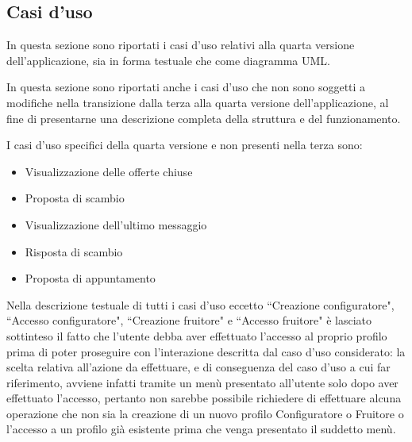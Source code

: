 \subsection{Casi d'uso}
In questa sezione sono riportati i casi d'uso relativi alla quarta versione dell'applicazione, sia in forma testuale che come diagramma UML.\bigskip 

In questa sezione sono riportati anche i casi d'uso che non sono soggetti a modifiche nella transizione dalla terza alla quarta versione dell'applicazione, al fine di presentarne una descrizione completa della struttura e del funzionamento.\bigskip

I casi d'uso specifici della quarta versione e non presenti nella terza sono:
\begin{itemize}
    \item Visualizzazione delle offerte chiuse
    \item Proposta di scambio
    \item Visualizzazione dell'ultimo messaggio
    \item Risposta di scambio
    \item Proposta di appuntamento
\end{itemize} \bigskip

Nella descrizione testuale di tutti i casi d'uso eccetto ``Creazione configuratore", ``Accesso configuratore", ``Creazione fruitore" e ``Accesso fruitore" è lasciato sottinteso il fatto che l'utente debba aver effettuato l'accesso al proprio profilo prima di poter proseguire con l'interazione descritta dal caso d'uso considerato: la scelta relativa all'azione da effettuare, e di conseguenza del caso d'uso a cui far riferimento, avviene infatti tramite un menù presentato all'utente solo dopo aver effettuato l'accesso, pertanto non sarebbe possibile richiedere di effettuare alcuna operazione che non sia la creazione di un nuovo profilo Configuratore o Fruitore o l'accesso a un profilo già esistente prima che venga presentato il suddetto menù.\bigskip



